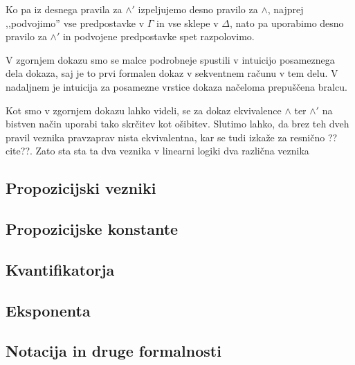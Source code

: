 \begin{dokaz}
    Ko pa iz desnega pravila za $\land'$ izpeljujemo desno pravilo za $\land$, najprej ,,podvojimo'' vse predpostavke v $\Gamma$ in vse sklepe v $\Delta$, nato pa uporabimo desno pravilo za $\land'$ in podvojene predpostavke spet razpolovimo.
    \begin{prooftree}
    \end{prooftree}
\end{dokaz}
\begin{opomba}
	V zgornjem dokazu smo se malce podrobneje spustili v intuicijo posameznega dela dokaza, saj je to prvi formalen dokaz v sekventnem računu v tem delu. V nadaljnem je intuicija za posamezne vrstice dokaza načeloma prepuščena bralcu.
\end{opomba}

Kot smo v zgornjem dokazu lahko videli, se za dokaz ekvivalence $\land$ ter $\land'$ na bistven način uporabi tako skrčitev kot ošibitev. Slutimo lahko, da brez teh dveh pravil veznika pravzaprav nista ekvivalentna, kar se tudi izkaže za resnično ??cite??. Zato sta sta ta dva veznika v linearni logiki dva različna veznika

\subsection{Propozicijski vezniki}


\subsection{Propozicijske konstante}


\subsection{Kvantifikatorja}


\subsection{Eksponenta}


\subsection{Notacija in druge formalnosti}

